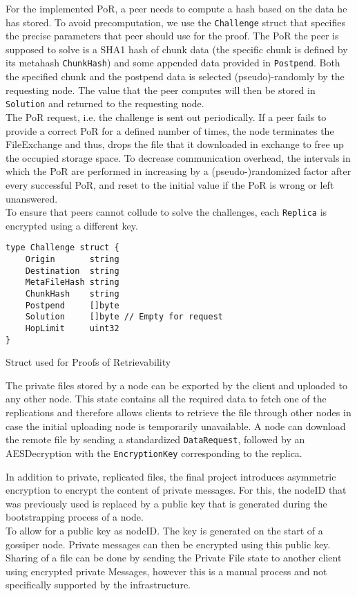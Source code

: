 \documentclass{article}
\begin{document}
\label{par:PoR}
For the implemented PoR, a peer needs to compute a hash based on the data he has stored. To avoid precomputation, we use the \texttt{Challenge} struct that specifies the precise parameters that peer should use for the proof. The PoR the peer is supposed to solve is a SHA1 hash of chunk data (the specific chunk is defined by its metahash \texttt{ChunkHash}) and some appended data provided in \texttt{Postpend}. Both the specified chunk and the postpend data is selected (pseudo)-randomly by the requesting node. The value that the peer computes will then be stored in \texttt{Solution} and returned to the requesting node.
\\
The PoR request, i.e. the challenge is sent out periodically. If a peer fails to provide a correct PoR for a defined number of times, the node terminates the FileExchange and thus, drops the file that it downloaded in exchange to free up the occupied storage space. 
To decrease communication overhead, the intervals in which the PoR are performed in increasing by a (pseudo-)randomized factor after every successful PoR, and reset to the initial value if the PoR is wrong or left unanswered.
\\
To ensure that peers cannot collude to solve the challenges, each \texttt{Replica} is encrypted using a different key.  

\begin{listing}
\begin{verbatim}
type Challenge struct {
	Origin       string
	Destination  string
	MetaFileHash string
	ChunkHash    string
	Postpend     []byte
	Solution     []byte // Empty for request
	HopLimit     uint32
}
\end{verbatim}
\caption{Struct used for Proofs of Retrievability}
\end{listing}

The private files stored by a node can be exported by the client and uploaded to any other node. This state contains all the required data to fetch one of the replications and therefore allows clients to retrieve the file through other nodes in case the initial uploading node is temporarily unavailable. A node can download the remote file by sending a standardized \texttt{DataRequest}, followed by an AESDecryption with the \texttt{EncryptionKey} corresponding to the replica. 
\\\vspace{0.5em}

 In addition to private, replicated files, the final project introduces asymmetric encryption to encrypt the content of private messages. 
For this, the nodeID that was previously used is replaced by a public key that is generated during the bootstrapping process of a node. 
\\
To allow for a public key as nodeID. The key is generated on the start of a gossiper node. Private messages can then be encrypted using this public key.
\\
Sharing of a file can be done by sending the Private File state to another client using encrypted private Messages, however this is a manual process and not specifically supported by the infrastructure.


\end{document}
